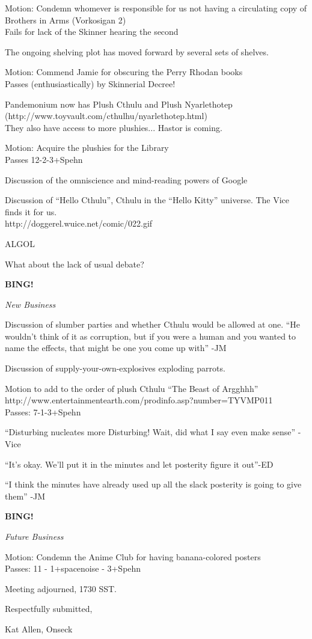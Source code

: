 \documentclass[12pt]{article}
\newcommand{\bing}{{\bf BING!} }
\newcommand{\goto}[1]{\bing \vskip 12pt \centerline{{\em{#1}}}}
\begin{document}
Motion: Condemn whomever is responsible for us not having a
circulating copy of Brothers in Arms (Vorkosigan 2)\\
Fails for lack of the Skinner hearing the second

The ongoing shelving plot has moved forward by several sets of shelves.

Motion: Commend Jamie for obscuring the Perry Rhodan books\\
Passes (enthusiastically) by Skinnerial Decree!
 
Pandemonium now has Plush Cthulu and Plush Nyarlethotep\\
 (http://www.toyvault.com/cthulhu/nyarlethotep.html)\\
They also have access to more plushies... Hastor is coming.


Motion: Acquire the plushies for the Library\\
Passes 12-2-3+Spehn

Discussion of the omniscience and mind-reading powers of Google

Discussion of ``Hello Cthulu'', Cthulu in the ``Hello Kitty''
universe. The Vice finds it for us. \\
       http://doggerel.wuice.net/comic/022.gif

ALGOL

What about the lack of usual debate?

\goto{New Business}
Discussion of slumber parties and whether Cthulu would be allowed at
one. ``He wouldn't think of it as corruption, but if you were a human
and you wanted to name the effects, that might be one you come up
with'' -JM

Discussion of supply-your-own-explosives exploding parrots.

Motion to add to the order of plush Cthulu ``The Beast of Argghhh''\\
http://www.entertainmentearth.com/prodinfo.asp?number=TYVMP011\\
Passes: 7-1-3+Spehn

``Disturbing nucleates more Disturbing! Wait, did what I say even make
sense'' -Vice

``It's okay. We'll put it in the minutes and let posterity figure it
out''-ED

``I think the minutes have already used up all the slack posterity is
going to give them'' -JM

\goto{Future Business}
 
Motion: Condemn the Anime Club for having banana-colored posters\\
Passes: 11 - 1+spacenoise - 3+Spehn

\vspace{12pt}
 
\noindent 
Meeting adjourned, 1730 SST.
 
\vspace{18pt}
 
\centerline{Respectfully submitted,} 
\centerline{Kat Allen,  Onseck}
 
\end{document}
